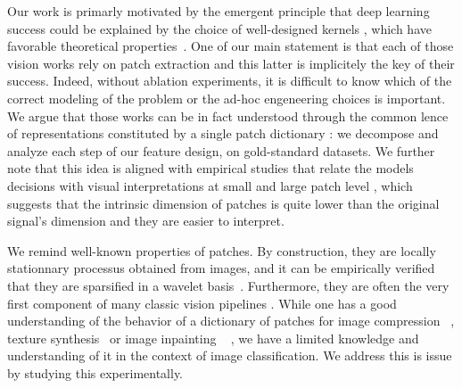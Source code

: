 \documentclass{article}
\begin{document}
Our work is primarly motivated by the emergent principle that  deep learning success  could be explained by the choice of  well-designed kernels \citep{mairal2016end,li2019enhanced,shankar2020neural,lu2014scale}, which have favorable theoretical properties~\citep{jacot2018neural,rahimi2008random}. One of our main statement is that each of those vision works rely on patch extraction and this latter is implicitely the key of their success.  Indeed, without ablation experiments, it is difficult to know which of  the correct modeling of the problem or  the ad-hoc engeneering choices is important. We argue that those works can be in fact understood through the common  lence of representations constituted by a single patch dictionary : we decompose and analyze each step of our feature design, on gold-standard  datasets. We further note that this idea is aligned with empirical studies that relate the models decisions with visual interpretations at small and large patch level
\citep{zeiler2014visualizing,brendel2019approximating}, which suggests that the intrinsic dimension of patches is quite  lower than the original signal's dimension and they are easier to interpret.



We remind well-known properties of patches. By construction,  they are locally stationnary processus obtained from images, and it can be empirically verified that they are sparsified in a wavelet basis~\citep{mallat1999wavelet}. Furthermore, they are often the very first component of many classic vision pipelines \citep{perronnin2010improving,lowe2004distinctive,brendel2019approximating,oyallon2018scattering}. While one has a good understanding of the behavior of a dictionary of patches for image compression
~\citep{wallace1992jpeg}, texture synthesis~\citep{efros1999texture} or image inpainting ~\citep{criminisi2004region} , we have a limited knowledge and understanding of it in the context of image classification. We address this is issue by studying this experimentally.
\end{document}
